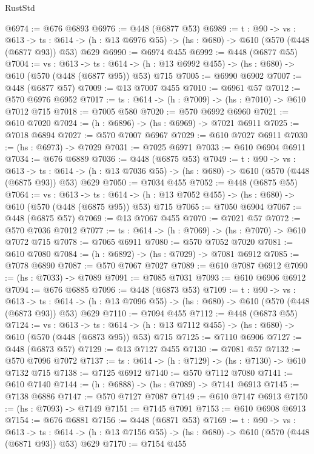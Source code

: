 \begin{lexlean}{RustStd}
\begin{coremodule}
@6974 := @676 @6893
@6976 := @448 (@6877 @53)
@6989 := {t : @90} ->
  {vs : @613} ->
  {ts : @614} -> (h : @13 @6976 @55) -> (hs : @680) -> @610 (@570 (@448 (@6877 @93)) @53) @629
@6990 := @6974 @455
@6992 := @448 (@6877 @55)
@7004 := {vs : @613} ->
  {ts : @614} -> (h : @13 @6992 @455) -> (hs : @680) -> @610 (@570 (@448 (@6877 @95)) @53) @715
@7005 := @6990 @6902
@7007 := @448 (@6877 @57)
@7009 := @13 @7007 @455
@7010 := @6961 @57
@7012 := @570 @6976 @6952
@7017 := {ts : @614} -> (h : @7009) -> (hs : @7010) -> @610 @7012 @715
@7018 := @7005 @580
@7020 := @570 @6992 @6960
@7021 := @610 @7020
@7024 := (h : @6896) -> (hs : @6969) -> @7021 @6911
@7025 := @7018 @6894
@7027 := @570 @7007 @6967
@7029 := @610 @7027 @6911
@7030 := (hs : @6973) -> @7029
@7031 := @7025 @6971
@7033 := @610 @6904 @6911
@7034 := @676 @6889
@7036 := @448 (@6875 @53)
@7049 := {t : @90} ->
  {vs : @613} ->
  {ts : @614} -> (h : @13 @7036 @55) -> (hs : @680) -> @610 (@570 (@448 (@6875 @93)) @53) @629
@7050 := @7034 @455
@7052 := @448 (@6875 @55)
@7064 := {vs : @613} ->
  {ts : @614} -> (h : @13 @7052 @455) -> (hs : @680) -> @610 (@570 (@448 (@6875 @95)) @53) @715
@7065 := @7050 @6904
@7067 := @448 (@6875 @57)
@7069 := @13 @7067 @455
@7070 := @7021 @57
@7072 := @570 @7036 @7012
@7077 := {ts : @614} -> (h : @7069) -> (hs : @7070) -> @610 @7072 @715
@7078 := @7065 @6911
@7080 := @570 @7052 @7020
@7081 := @610 @7080
@7084 := (h : @6892) -> (hs : @7029) -> @7081 @6912
@7085 := @7078 @6890
@7087 := @570 @7067 @7027
@7089 := @610 @7087 @6912
@7090 := (hs : @7033) -> @7089
@7091 := @7085 @7031
@7093 := @610 @6906 @6912
@7094 := @676 @6885
@7096 := @448 (@6873 @53)
@7109 := {t : @90} ->
  {vs : @613} ->
  {ts : @614} -> (h : @13 @7096 @55) -> (hs : @680) -> @610 (@570 (@448 (@6873 @93)) @53) @629
@7110 := @7094 @455
@7112 := @448 (@6873 @55)
@7124 := {vs : @613} ->
  {ts : @614} -> (h : @13 @7112 @455) -> (hs : @680) -> @610 (@570 (@448 (@6873 @95)) @53) @715
@7125 := @7110 @6906
@7127 := @448 (@6873 @57)
@7129 := @13 @7127 @455
@7130 := @7081 @57
@7132 := @570 @7096 @7072
@7137 := {ts : @614} -> (h : @7129) -> (hs : @7130) -> @610 @7132 @715
@7138 := @7125 @6912
@7140 := @570 @7112 @7080
@7141 := @610 @7140
@7144 := (h : @6888) -> (hs : @7089) -> @7141 @6913
@7145 := @7138 @6886
@7147 := @570 @7127 @7087
@7149 := @610 @7147 @6913
@7150 := (hs : @7093) -> @7149
@7151 := @7145 @7091
@7153 := @610 @6908 @6913
@7154 := @676 @6881
@7156 := @448 (@6871 @53)
@7169 := {t : @90} ->
  {vs : @613} ->
  {ts : @614} -> (h : @13 @7156 @55) -> (hs : @680) -> @610 (@570 (@448 (@6871 @93)) @53) @629
@7170 := @7154 @455

\end{coremodule}
\end{lexlean}
